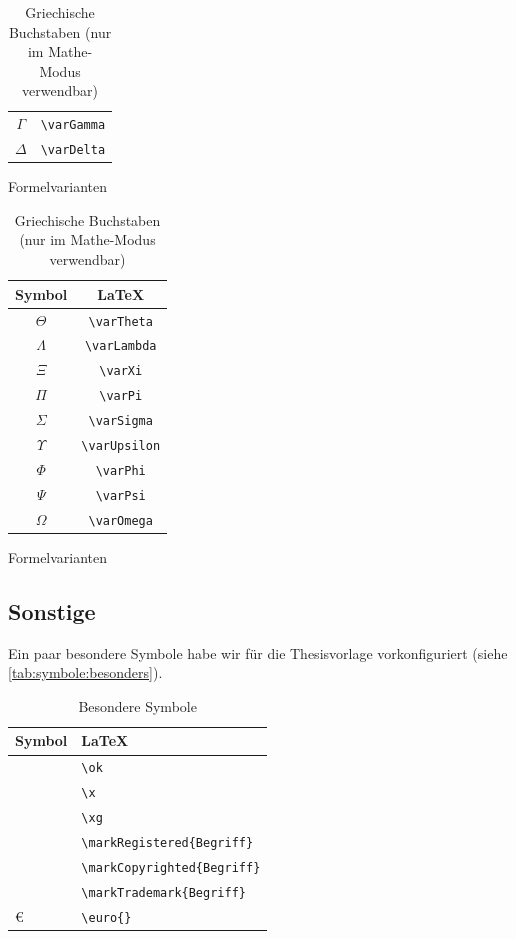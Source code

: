 \begin{table}[ht]
\begin{subtable}[b]{0.27\linewidth}
\begin{tabular}{c|c}
						$\varGamma$ & \lstinline|\varGamma|\\
						$\varDelta$ & \lstinline|\varDelta|\\
					\end{tabular}
					\caption{Formelvarianten}
				\end{subtable}
				\begin{subtable}[b]{0.26\linewidth}
					\begin{tabular}{c|c}
						Symbol & \LaTeX\\\hline
						
						$\varTheta$ & \lstinline|\varTheta|\\
						$\varLambda$ & \lstinline|\varLambda|\\
						$\varXi$ & \lstinline|\varXi| \\
						$\varPi$ & \lstinline|\varPi|\\
						$\varSigma$ & \lstinline|\varSigma|\\
						$\varUpsilon$ & \lstinline|\varUpsilon|\\
						$\varPhi$ & \lstinline|\varPhi|\\
						$\varPsi$ & \lstinline|\varPsi|\vphantom{\vdots}\\
						$\varOmega$ & \lstinline|\varOmega|
					\end{tabular}
					\caption{Formelvarianten}
				\end{subtable}
								
				\caption[Griechische Buchstaben]{Griechische Buchstaben (nur im Mathe-Modus verwendbar)}
				\label{tab:symbole:griechisch}
			\end{table}
		
		\subsection{Sonstige}
			Ein paar besondere Symbole habe wir für die Thesisvorlage vorkonfiguriert (siehe \autoref{tab:symbole:besonders}).
			\begin{table}[h]
				\begin{tabular}{l|l}
					Symbol & \LaTeX\\\hline
					\ok							& \lstinline|\ok|\\
					\x							& \lstinline|\x|\\
					\xg							& \lstinline|\xg|\\
					\markRegistered{Begriff}	& \lstinline|\markRegistered{Begriff}|\\
					\markCopyrighted{Begriff}	& \lstinline|\markCopyrighted{Begriff}|\\
					\markTrademark{Begriff}		& \lstinline|\markTrademark{Begriff}|\\
					\euro{}						& \lstinline|\euro{}|\\
				\end{tabular}
				\caption{Besondere Symbole}
				\label{tab:symbole:besonders}
			\end{table}
		
